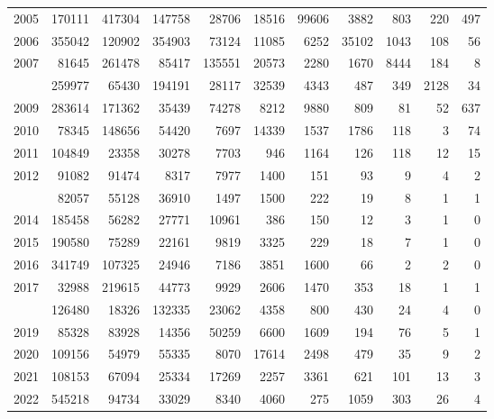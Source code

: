 \documentclass[
]{article}
\begin{document}
\begin{longtable}[t]{lrrrrrrrrrr}
2005 & 170111 & 417304 & 147758 & 28706 & 18516 & 99606 & 3882 & 803 & 220 & 497\\
2006 & 355042 & 120902 & 354903 & 73124 & 11085 & 6252 & 35102 & 1043 & 108 & 56\\
2007 & 81645 & 261478 & 85417 & 135551 & 20573 & 2280 & 1670 & 8444 & 184 & 8\\
\addlinespace
2008 & 259977 & 65430 & 194191 & 28117 & 32539 & 4343 & 487 & 349 & 2128 & 34\\
2009 & 283614 & 171362 & 35439 & 74278 & 8212 & 9880 & 809 & 81 & 52 & 637\\
2010 & 78345 & 148656 & 54420 & 7697 & 14339 & 1537 & 1786 & 118 & 3 & 74\\
2011 & 104849 & 23358 & 30278 & 7703 & 946 & 1164 & 126 & 118 & 12 & 15\\
2012 & 91082 & 91474 & 8317 & 7977 & 1400 & 151 & 93 & 9 & 4 & 2\\
\addlinespace
2013 & 82057 & 55128 & 36910 & 1497 & 1500 & 222 & 19 & 8 & 1 & 1\\
2014 & 185458 & 56282 & 27771 & 10961 & 386 & 150 & 12 & 3 & 1 & 0\\
2015 & 190580 & 75289 & 22161 & 9819 & 3325 & 229 & 18 & 7 & 1 & 0\\
2016 & 341749 & 107325 & 24946 & 7186 & 3851 & 1600 & 66 & 2 & 2 & 0\\
2017 & 32988 & 219615 & 44773 & 9929 & 2606 & 1470 & 353 & 18 & 1 & 1\\
\addlinespace
2018 & 126480 & 18326 & 132335 & 23062 & 4358 & 800 & 430 & 24 & 4 & 0\\
2019 & 85328 & 83928 & 14356 & 50259 & 6600 & 1609 & 194 & 76 & 5 & 1\\
2020 & 109156 & 54979 & 55335 & 8070 & 17614 & 2498 & 479 & 35 & 9 & 2\\
2021 & 108153 & 67094 & 25334 & 17269 & 2257 & 3361 & 621 & 101 & 13 & 3\\
2022 & 545218 & 94734 & 33029 & 8340 & 4060 & 275 & 1059 & 303 & 26 & 4\\*
\end{longtable}
\end{document}
